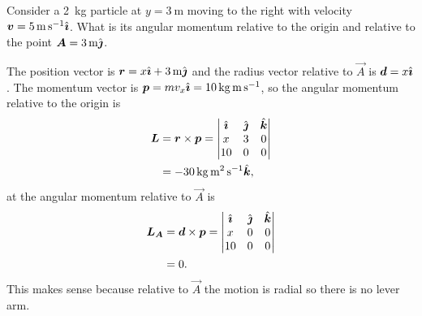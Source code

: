 \documentclass[../classical_mechanics.tex]{subfiles}
\begin{document}
        \begin{example}
            Consider a \qty{2}{\kilogram} particle at $y=\qty{3}{\meter}$ moving to the right with velocity $\boldsymbol{v}=\qty{5}{\meter\per\second}\hat{\boldsymbol{\imath}}$.
            What is its angular momentum relative to the origin and relative to the point $\boldsymbol{A}=\qty{3}{\meter}\hat{\boldsymbol{\jmath}}$.
            \begin{figure}[H]
                \centering
            \end{figure}
            The position vector is $\boldsymbol{r}=x\hat{\boldsymbol{\imath}}+\qty{3}{\meter}\hat{\boldsymbol{\jmath}}$ and the radius vector relative to $\vec{A}$ is $\boldsymbol{d}=x\hat{\boldsymbol{\imath}}$.
            The momentum vector is $\boldsymbol{p}=mv_x\hat{\boldsymbol{\imath}}=\qty{10}{\kilogram\meter\per\second}$, so the angular momentum relative to the origin is
            \begin{align}
                \boldsymbol{L}&=\boldsymbol{r}\times\boldsymbol{p}=\begin{vmatrix}
                    \hat{\boldsymbol{\imath}} & \hat{\boldsymbol{\jmath}} & \hat{\boldsymbol{k}} \\
                    x & 3 & 0 \\
                    10 & 0 & 0
                \end{vmatrix}\\
                &=-\qty{30}{\kilogram\meter\squared\per\second}\hat{\boldsymbol{k}},
            \end{align}
            at the angular momentum relative to $\vec{A}$ is
            \begin{align}
                \boldsymbol{L}_{\boldsymbol{A}}&=\boldsymbol{d}\times\boldsymbol{p}=\begin{vmatrix}
                    \hat{\boldsymbol{\imath}} & \hat{\boldsymbol{\jmath}} & \hat{\boldsymbol{k}} \\
                    x & 0 & 0 \\
                    10 & 0 & 0
                \end{vmatrix}\\
                &=0.
            \end{align}
            This makes sense because relative to $\vec{A}$ the motion is radial so there is no lever arm.
        \end{example}
\end{document}
